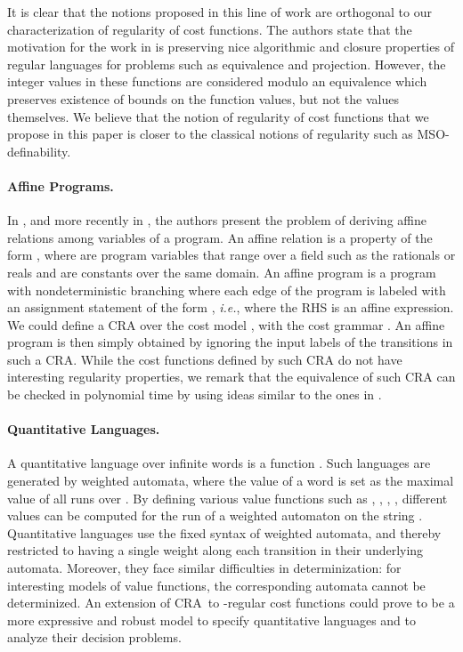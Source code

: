 \documentclass[11pt]{article}
\newcommand{\EDWA}{{CRA}\xspace}
\newcommand{\ie}{{\em i.e.}\xspace}
\begin{document}
It is clear that the notions proposed in this line of work are
orthogonal to our characterization of regularity of cost functions.
The authors state that the motivation for the work in
\cite{colcombet_theory_2009,colcombet_regular_2010} is preserving nice
algorithmic and closure properties of regular languages for problems
such as equivalence and projection. However, the integer values in
these functions are considered modulo an equivalence which preserves
existence of bounds on the function values, but not the values
themselves. We believe that the notion of regularity of cost functions
that we propose in this paper is closer to the classical notions of
regularity such as MSO-definability.

\paragraph{Affine Programs.} In \cite{karr_affine_1976}, and more
recently in \cite{olm_note_2004, olm_precise_2004}, the authors
present the problem of deriving affine relations among variables of a
program.  An affine relation is a property of the form , where
 are program variables that range
over a field such as the rationals or reals and   are constants
over the same domain. An affine program is a program with
nondeterministic branching where each edge of the program is labeled
with an assignment statement of the form ,
\ie, where the RHS is an affine expression. We could define a \EDWA
over the cost model , with the cost
grammar . An affine program is then
simply obtained by ignoring the input labels of the transitions in
such a \EDWA.  While the cost functions defined by such \EDWA do not
have interesting regularity properties, we remark that the equivalence
of such \EDWA can be checked in polynomial time by using ideas similar
to the ones in \cite{olm_note_2004}.

\paragraph{Quantitative Languages.} A quantitative language
\cite{CDH10,almagor_what_2011,AKL10} over infinite words is a function
. Such languages are generated by
weighted automata, where the value of a word  is set as the maximal
value of all runs over . By defining various value functions such
as , , ,
, different values can be computed for the run of a
weighted automaton on the string .  Quantitative languages use the
fixed syntax of weighted automata, and thereby restricted to having a
single weight along each transition in their underlying automata.
Moreover, they face similar difficulties in determinization: for
interesting models of value functions, the corresponding automata
cannot be determinized.  An extension of \EDWA\ to -regular
cost functions could prove to be a more expressive and robust model to
specify quantitative languages and to analyze their decision problems.
\end{document}
